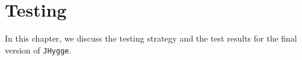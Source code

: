 \chapter{Testing}\label{sec:testing}

In this chapter, we discuss the testing strategy and the test results for the final version of \texttt{JHygge}.
